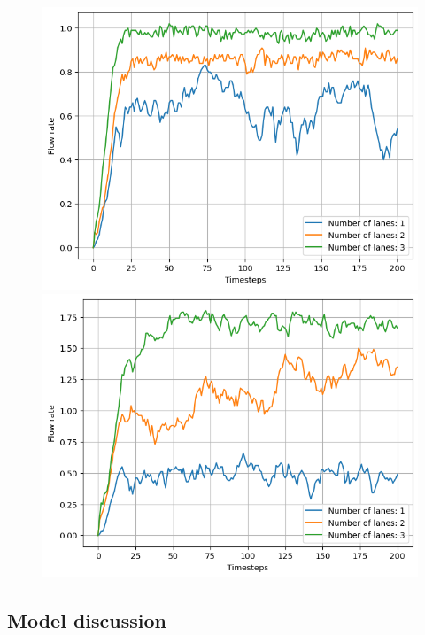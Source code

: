 \documentclass[a4paper,12pt]{article}
\begin{document}
\begin{figure}[H]
    \centering
    \begin{minipage}{.5\textwidth}
        \centering
        \includegraphics[scale=0.45]{Images/flowrate time 10 cars.png}
    \end{minipage}%
    \begin{minipage}{.5\textwidth}
        \centering
        \includegraphics[scale=0.45]{Images/flowrate time 20 cars.png}
    \end{minipage}
    \caption{}
    \label{3.2d}
\end{figure}


\subsection*{Model discussion}
\end{document}
